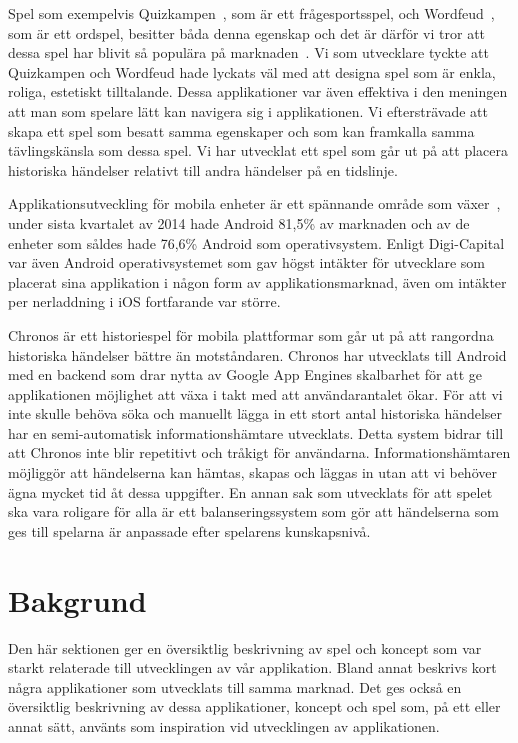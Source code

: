 \documentclass[a4paper, 11pt]{article}
\begin{document}
Spel som exempelvis Quizkampen~\cite{quiz}, som är ett frågesportsspel, och Wordfeud~\cite{wordfeud}, som är ett ordspel, besitter båda denna egenskap och det är därför vi tror att dessa spel har blivit så populära på marknaden~\cite{appsalesrating}. Vi som utvecklare tyckte att Quizkampen och Wordfeud hade lyckats väl med att designa spel som är enkla, roliga, estetiskt tilltalande. Dessa applikationer var även effektiva i den meningen att man som spelare lätt kan navigera sig i applikationen. Vi eftersträvade att skapa ett spel som besatt samma egenskaper och som kan framkalla samma tävlingskänsla som dessa spel. Vi har utvecklat ett spel som går ut på att placera historiska händelser relativt till andra händelser på en tidslinje. 

Applikationsutveckling för mobila enheter är ett spännande område som växer~\cite{IDC}, under sista kvartalet av 2014 hade Android 81,5\% av marknaden och av de enheter som såldes hade 76,6\% Android som operativsystem. Enligt Digi-Capital~\cite{revenue} var även Android operativsystemet som gav högst intäkter för utvecklare som placerat sina applikation i någon form av applikationsmarknad, även om intäkter per nerladdning i iOS fortfarande var större.

Chronos är ett historiespel för mobila plattformar som går ut på att rangordna historiska händelser bättre än motståndaren. Chronos har utvecklats till Android med en backend som drar nytta av Google App Engines skalbarhet för att ge applikationen möjlighet att växa i takt med att användarantalet ökar. För att vi inte skulle behöva söka och manuellt lägga in ett stort antal historiska händelser har en semi-automatisk informationshämtare utvecklats. Detta system bidrar till att Chronos inte blir repetitivt och tråkigt för användarna. Informationshämtaren möjliggör att händelserna kan hämtas, skapas och läggas in utan att vi behöver ägna mycket tid åt dessa uppgifter. En annan sak som utvecklats för att spelet ska vara roligare för alla är ett balanseringssystem som gör att händelserna som ges till spelarna är anpassade efter spelarens kunskapsnivå.

\newpage
\section{Bakgrund}
Den här sektionen ger en översiktlig beskrivning av spel och koncept som var starkt relaterade till utvecklingen av vår applikation. Bland annat beskrivs kort några applikationer som utvecklats till samma marknad. Det ges också en översiktlig beskrivning av dessa applikationer, koncept och spel som, på ett eller annat sätt, använts som inspiration vid utvecklingen av applikationen. 
\end{document}
